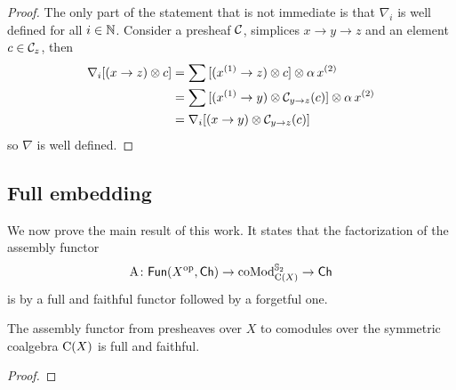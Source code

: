 \begin{proof}
	The only part of the statement that is not immediate is that $\nabla_i$ is well defined for all $i \in \mathbb{N}$.
	Consider a presheaf $\mathcal{C}$, simplices $x \to y \to z$ and an element $c \in \mathcal{C}_z$, then
	\begin{align*}
		\nabla_i [(x \to z) \otimes c] &=
		\sum {[(x^{(1)} \to z) \otimes c]} \otimes \alpha \, x^{(2)} \\ &=
		\sum {[(x^{(1)} \to y) \otimes\mathcal{C}_{y \to z}(c)]} \otimes \alpha \, x^{(2)} \\ &=
		\nabla_i [(x \to y) \otimes \mathcal{C}_{y \to z}(c)]
	\end{align*}
	so $\nabla$ is well defined.
\end{proof}

\subsection{Full embedding} \label{ss:full embedding}

We now prove the main result of this work.
It states that the factorization of the assembly functor
\[
\operatorname{A} \colon \mathsf{Fun}(X^{\mathrm{op}}, \mathsf{Ch}) \to \operatorname{coMod}^{\mathbb{S}_2}_{\operatorname{C}(X)} \to \mathsf{Ch}
\]
is by a full and faithful functor followed by a forgetful one.

\begin{theorem*}
	The assembly functor from presheaves over $X$ to comodules over the symmetric coalgebra $\operatorname{C}(X)$ is full and faithful.
\end{theorem*}

\begin{proof}
	
\end{proof}